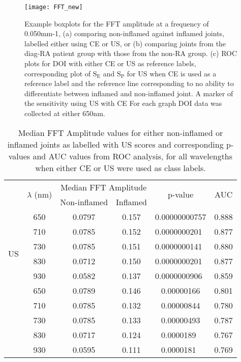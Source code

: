 \documentclass[twoside]{bhamthesis}
\theoremstyle{definition}
\begin{document}
\begin{figure}[!ht]
\centering\texttt{[image: FFT\_new]}\caption{Example boxplots for the FFT amplitude at a frequency of 0.050mm-1, (a) comparing non-inflamed against inflamed joints, labelled either using CE or US, or (b) comparing joints from the diag-RA patient group with those from the non-RA group. (c) ROC plots for DOI with either CE or US as reference labels, corresponding plot of $\mathrm{S_E}$ and $\mathrm{S_P}$ for US when CE is used as a reference label and the reference line corresponding to no ability to differentiate between inflamed and non-inflamed joint. A marker of the sensitivity using US with CE For each graph DOI data was collected at either 650nm.}
\label{fig:ROC_CURVES}
\end{figure}

\begin{table}[!ht]
\caption{Median FFT Amplitude values for either non-inflamed or inflamed joints as labelled with US scores and corresponding p-values and AUC values from ROC analysis, for all wavelengths when either CE or US were used as class labels.} 
\label{tab:diagnostic accuracy}
\begin{center}       
\begin{tabular}{c c c c c c}
\hline
\rule[-1ex]{0pt}{3.5ex} & \multirow{ 2}{*}{$\lambda$ (nm)} & \multicolumn{2}{c}{Median FFT Amplitude}  & \multirow{ 2}{*}{p-value} & \multirow{ 2}{*}{AUC}\\
& & Non-inflamed & Inflamed & & \\
\hline
\multirow{6}{*}{US} & \rule[-1ex]{0pt}{3.5ex}  650 & 0.0797 & 0.157 & 0.00000000757 & 0.888  \\
 & \rule[-1ex]{0pt}{3.5ex}  710 & 0.0785 & 0.152 &  0.0000000201\textcolor{white}{0}  & 0.877\\
 & \rule[-1ex]{0pt}{3.5ex}  730 & 0.0785 & 0.151 & 0.0000000141\textcolor{white}{0}  & 0.880\\
 & \rule[-1ex]{0pt}{3.5ex}  830  & 0.0712 & 0.150 & 0.0000000201\textcolor{white}{0} & 0.877\\
 & \rule[-1ex]{0pt}{3.5ex}  930  & 0.0582 & 0.137 &  0.0000000906\textcolor{white}{0}& 0.859\\
\hline
\multirow{6}{*}{CE} & \rule[-1ex]{0pt}{3.5ex}  650 & 0.0789 & 0.146 & 0.00000166 & 0.801 \\
 & \rule[-1ex]{0pt}{3.5ex}  710 & 0.0785 & 0.132 & 0.00000844 & 0.780 \\
 & \rule[-1ex]{0pt}{3.5ex}  730 & 0.0785 & 0.133 & 0.00000493  & 0.787 \\
 & \rule[-1ex]{0pt}{3.5ex}  830 & 0.0717 & 0.124 & 0.0000189\textcolor{white}{0} & 0.767\\
 & \rule[-1ex]{0pt}{3.5ex}  930 & 0.0595 & 0.111 & 0.0000181\textcolor{white}{0} & 0.769\\
\hline
\end{tabular}
\end{center}
\end{table}
\end{document}
